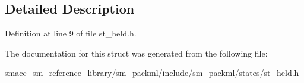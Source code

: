 \subsection{Detailed Description}


Definition at line 9 of file st\+\_\+held.\+h.



The documentation for this struct was generated from the following file\+:\begin{DoxyCompactItemize}
\item 
smacc\+\_\+sm\+\_\+reference\+\_\+library/sm\+\_\+packml/include/sm\+\_\+packml/states/\hyperlink{st__held_8h}{st\+\_\+held.\+h}\end{DoxyCompactItemize}
